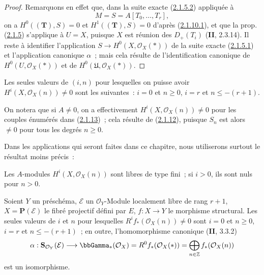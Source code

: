 \begin{proof}
Remarquons en effet que, dans la suite exacte
(\hyperref[III.2.1.5.2-fr]{2.1.5.2}) appliquée à
\[
M=S=A[T_0,\ldots,T_r],
\]
on a
$H^0((\mathbf T),S)=0$ et $H^1((\mathbf T),S)=0$ d'après
(\hyperref[III.2.1.10.1-fr]{2.1.10.1}), et que la prop.
(\hyperref[III.2.1.5-fr]{2.1.5}) s'applique à $U=X$, puisque $X$ est
réunion des $D_+(T_i)$ (\textbf{II}, 2.3.14). Il reste à identifier l'application
$S\to H^0(X,\mathcal O_X(*))$ de la suite exacte
(\hyperref[III.2.1.5.1-fr]{2.1.5.1}) et l'application canonique $\alpha$~;
mais cela résulte de l'identification canonique de
$H^0(U,\mathcal O_X(*))$ et de $H^0(\mathfrak U,\mathcal O_X(*))$.
\end{proof}

\begin{corollary}[2.1.13]
\label{III.2.1.13-fr}
Les seules valeurs de $(i,n)$ pour lesquelles on puisse avoir
$H^i(X,\mathcal O_X(n))\neq0$ sont les suivantes~:
$i=0$ et $n\geq0$, $i=r$ \textup{et} $n\leq-(r+1)$.
\end{corollary}

On notera que si $A\neq0$, on a effectivement
$H^i(X,\mathcal O_X(n))\neq0$ pour les couples énumérés dans
(\hyperref[III.2.1.13-fr]{2.1.13})~; cela résulte de
(\hyperref[III.2.1.12-fr]{2.1.12}), puisque $S_n$ est alors $\neq0$ pour
tous les degrés $n\geq0$.

Dans les applications qui seront faites dans ce chapitre, nous utiliserons
surtout le résultat moins précis~:

\begin{corollary}[2.1.14]
\label{III.2.1.14-fr}
Les $A$-modules $H^i(X,\mathcal O_X(n))$ sont libres de type fini~; si
$i>0$, ils sont nuls pour $n>0$.
\end{corollary}

\begin{proposition}[2.1.15]
\label{III.2.1.15-fr}
Soient $Y$ un préschéma, $\mathcal E$ un $\mathcal O_Y$-Module localement
libre de rang $r+1$, $X=\mathbf P(\mathcal E)$ le fibré projectif défini
par $E$, $f:X\to Y$ le morphisme structural. Les seules valeurs de
$i$ et $n$ pour lesquelles $R^if_*(\mathcal O_X(n))\neq0$ sont
$i=0$ et $n\geq0$, $i=r$ et $n\leq-(r+1)$~; en outre, l'homomorphisme
canonique (\textbf{II}, 3.3.2)
\[
\alpha:\mathbf S_{\mathcal O_Y}(\mathcal E)
\longrightarrow\bbGamma_*(\mathcal O_X)
=R^0f_*(\mathcal O_X(*))
=\bigoplus_{n\in\mathbb Z}f_*(\mathcal O_X(n))
\]
est un isomorphisme.
\end{proposition}

